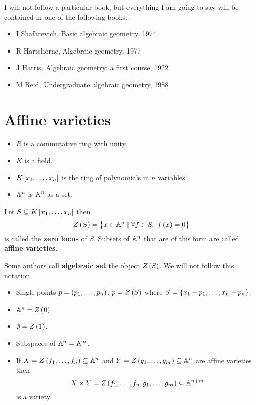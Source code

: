 I will not follow a particular book, but everything I am going to say will be contained in one of the following books.
\begin{itemize}
\item I Shafarevich, Basic algebraic geometry, 1974
\item R Hartshorne, Algebraic geometry, 1977
\item J Harris, Algebraic geometry: a first course, 1922
\item M Reid, Undergraduate algebraic geometry, 1988
\end{itemize}

\pagebreak

\section{Affine varieties}

\begin{notation}
\hfill
\begin{itemize}
\item $ R $ is a commutative ring with unity.
\item $ K $ is a field.
\item $ K\sbr{x_1, \dots, x_n} $ is the ring of polynomials in $ n $ variables.
\item $ \mathbb{A}^n $ is $ K^n $ as a set.
\end{itemize}
\end{notation}

\begin{definition}
Let $ S \subseteq K\sbr{x_1, \dots, x_n} $ then
$$ Z\br{S} = \cbr{x \in \A^n \mid \forall f \in S, \ f\br{x} = 0} $$
is called the \textbf{zero locus} of $ S $. Subsets of $ \mathbb{A}^n $ that are of this form are called \textbf{affine varieties}.
\end{definition}

\begin{remark}
Some authors call \textbf{algebraic set} the object $ Z\br{S} $. We will not follow this notation.
\end{remark}

\begin{example}
\hfill
\begin{itemize}
\item Single points $ p = \br{p_1, \dots, p_n} $. $ p = Z\br{S} $ where $ S = \cbr{x_1 - p_1, \dots, x_n - p_n} $.
\item $ \A^n = Z\br{0} $.
\item $ \emptyset = Z\br{1} $.
\item Subspaces of $ \mathbb{A}^n = K^n $.
\item If $ X = Z\br{f_1, \dots, f_n} \subseteq \A^n $ and $ Y = Z\br{g_1, \dots, g_m} \subseteq \A^n $ are affine varieties then
$$ X \times Y = Z\br{f_1, \dots, f_n, g_1, \dots, g_m} \subseteq \A^{n + m} $$
is a variety.
\end{itemize}
\end{example}

